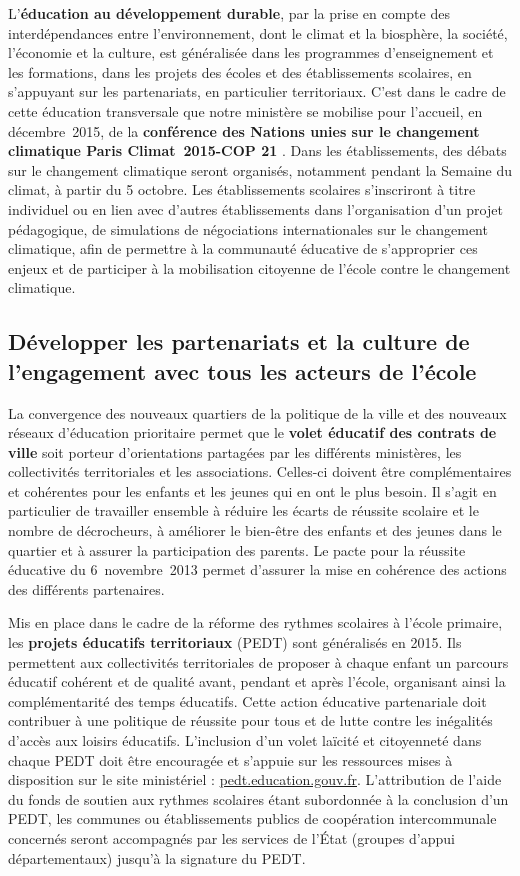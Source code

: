 L’\textbf{éducation au développement durable}, par la prise en compte des interdépendances entre l’environnement, dont le climat et la biosphère, la société, l’économie et la culture, est généralisée dans les programmes d’enseignement et les formations, dans les projets des écoles et des établissements scolaires, en s’appuyant sur les partenariats, en particulier territoriaux. C’est dans le cadre de cette éducation transversale que notre ministère se mobilise pour l’accueil, en décembre~2015, de la \textbf{conférence des Nations unies sur le changement climatique \og Paris Climat~2015-COP 21 \fg{}}. Dans les établissements, des débats sur le changement climatique seront organisés, notamment pendant la Semaine du climat, à partir du 5 octobre. Les établissements scolaires s’inscriront à titre individuel ou en lien avec d’autres établissements dans l’organisation d’un projet pédagogique, de simulations de négociations internationales sur le changement climatique, afin de permettre à la communauté éducative de s’approprier ces enjeux et de participer à la mobilisation citoyenne de l’école contre le changement climatique.

\subsection{Développer les partenariats et la culture de l’engagement avec tous les acteurs de l’école}
La convergence des nouveaux quartiers de la politique de la ville et des nouveaux réseaux d’éducation prioritaire permet que le \textbf{volet éducatif des contrats de ville} soit porteur d’orientations partagées par les différents ministères, les collectivités territoriales et les associations. Celles-ci doivent être complémentaires et cohérentes pour les enfants et les jeunes qui en ont le plus besoin. Il s’agit en particulier de travailler ensemble à réduire les écarts de réussite scolaire et le nombre de décrocheurs, à améliorer le bien-être des enfants et des jeunes dans le quartier et à assurer la participation des parents. Le pacte pour la réussite éducative du 6~novembre~2013 permet d’assurer la mise en cohérence des actions des différents partenaires.

Mis en place dans le cadre de la réforme des rythmes scolaires à l’école primaire, les \textbf{projets éducatifs territoriaux} (PEDT) sont généralisés en 2015. Ils permettent aux collectivités territoriales de proposer à chaque enfant un parcours éducatif cohérent et de qualité avant, pendant et après l’école, organisant ainsi la complémentarité des temps éducatifs. Cette action éducative partenariale doit contribuer à une politique de réussite pour tous et de lutte contre les inégalités d’accès aux loisirs éducatifs. L’inclusion d’un volet \og laïcité et citoyenneté \fg{} dans chaque PEDT doit être encouragée et s’appuie sur les ressources mises à disposition sur le site ministériel : \href{http://pedt.education.gouv.fr/}{pedt.education.gouv.fr}. L’attribution de l’aide du \og fonds de soutien \fg{} aux rythmes scolaires étant subordonnée à la conclusion d’un PEDT, les communes ou établissements publics de coopération intercommunale concernés seront accompagnés par les services de l’État (groupes d’appui départementaux) jusqu’à la signature du PEDT.

